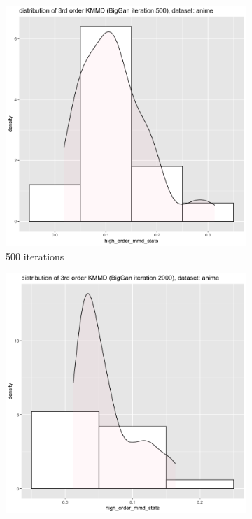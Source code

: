 \documentclass{article}
\begin{document}
\begin{figure}[h!]
    \caption{Dataset Anime}
     \centering
     \begin{subfigure}[b]{0.3\textwidth}
         \centering
         \includegraphics[width=\textwidth]{kmmd_figures/biggan_anime_highdist_500.png}
         \caption{500 iterations}
     \end{subfigure}
     \hfill
     \begin{subfigure}[b]{0.3\textwidth}
         \centering
         \includegraphics[width=\textwidth]{kmmd_figures/biggan_anime_highdist_2000.png}

\end{subfigure}
\end{figure}
\end{document}
